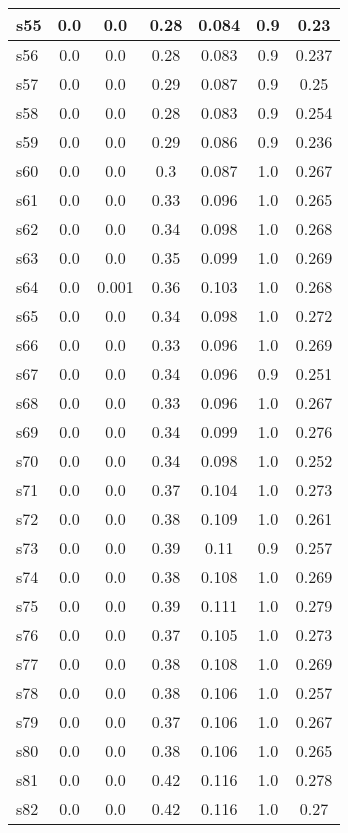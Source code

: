 \documentclass{article}
\begin{document}
\begin{tabular}{|l|c|c|c|c|c|c|}
s55 &0.0 & 0.0 & 0.28 & 0.084 & 0.9 & 0.23\\
\hline
s56 &0.0 & 0.0 & 0.28 & 0.083 & 0.9 & 0.237\\
\hline
s57 &0.0 & 0.0 & 0.29 & 0.087 & 0.9 & 0.25\\
\hline
s58 &0.0 & 0.0 & 0.28 & 0.083 & 0.9 & 0.254\\
\hline
s59 &0.0 & 0.0 & 0.29 & 0.086 & 0.9 & 0.236\\
\hline
s60 &0.0 & 0.0 & 0.3 & 0.087 & 1.0 & 0.267\\
\hline
s61 &0.0 & 0.0 & 0.33 & 0.096 & 1.0 & 0.265\\
\hline
s62 &0.0 & 0.0 & 0.34 & 0.098 & 1.0 & 0.268\\
\hline
s63 &0.0 & 0.0 & 0.35 & 0.099 & 1.0 & 0.269\\
\hline
s64 &0.0 & 0.001 & 0.36 & 0.103 & 1.0 & 0.268\\
\hline
s65 &0.0 & 0.0 & 0.34 & 0.098 & 1.0 & 0.272\\
\hline
s66 &0.0 & 0.0 & 0.33 & 0.096 & 1.0 & 0.269\\
\hline
s67 &0.0 & 0.0 & 0.34 & 0.096 & 0.9 & 0.251\\
\hline
s68 &0.0 & 0.0 & 0.33 & 0.096 & 1.0 & 0.267\\
\hline
s69 &0.0 & 0.0 & 0.34 & 0.099 & 1.0 & 0.276\\
\hline
s70 &0.0 & 0.0 & 0.34 & 0.098 & 1.0 & 0.252\\
\hline
s71 &0.0 & 0.0 & 0.37 & 0.104 & 1.0 & 0.273\\
\hline
s72 &0.0 & 0.0 & 0.38 & 0.109 & 1.0 & 0.261\\
\hline
s73 &0.0 & 0.0 & 0.39 & 0.11 & 0.9 & 0.257\\
\hline
s74 &0.0 & 0.0 & 0.38 & 0.108 & 1.0 & 0.269\\
\hline
s75 &0.0 & 0.0 & 0.39 & 0.111 & 1.0 & 0.279\\
\hline
s76 &0.0 & 0.0 & 0.37 & 0.105 & 1.0 & 0.273\\
\hline
s77 &0.0 & 0.0 & 0.38 & 0.108 & 1.0 & 0.269\\
\hline
s78 &0.0 & 0.0 & 0.38 & 0.106 & 1.0 & 0.257\\
\hline
s79 &0.0 & 0.0 & 0.37 & 0.106 & 1.0 & 0.267\\
\hline
s80 &0.0 & 0.0 & 0.38 & 0.106 & 1.0 & 0.265\\
\hline
s81 &0.0 & 0.0 & 0.42 & 0.116 & 1.0 & 0.278\\
\hline
s82 &0.0 & 0.0 & 0.42 & 0.116 & 1.0 & 0.27\\
\hline

\end{tabular}
\end{document}

